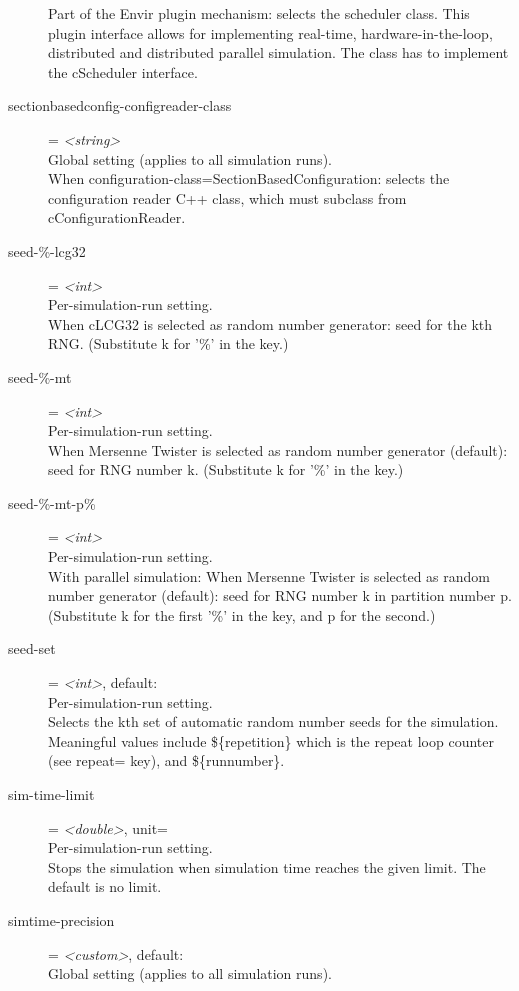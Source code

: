 \begin{description}
    Part of the Envir plugin mechanism: selects the scheduler class. This
    plugin interface allows for implementing real-time, hardware-in-the-loop,
    distributed and distributed parallel simulation. The class has to implement
    the cScheduler interface.
\item[sectionbasedconfig-configreader-class] = \textit{<string>}\\
    Global setting (applies to all simulation runs).\\
    When configuration-class=SectionBasedConfiguration: selects the
    configuration reader C++ class, which must subclass from
    cConfigurationReader.
\item[seed-\%-lcg32] = \textit{<int>}\\
    Per-simulation-run setting.\\
    When cLCG32 is selected as random number generator: seed for the kth RNG.
    (Substitute k for '\%' in the key.)
\item[seed-\%-mt] = \textit{<int>}\\
    Per-simulation-run setting.\\
    When Mersenne Twister is selected as random number generator (default):
    seed for RNG number k. (Substitute k for '\%' in the key.)
\item[seed-\%-mt-p\%] = \textit{<int>}\\
    Per-simulation-run setting.\\
    With parallel simulation: When Mersenne Twister is selected as random
    number generator (default): seed for RNG number k in partition number p.
    (Substitute k for the first '\%' in the key, and p for the second.)
\item[seed-set] = \textit{<int>}, default: \\
    Per-simulation-run setting.\\
    Selects the kth set of automatic random number seeds for the simulation.
    Meaningful values include \$\{repetition\} which is the repeat loop counter
    (see repeat= key), and \$\{runnumber\}.
\item[sim-time-limit] = \textit{<double>}, unit=\\
    Per-simulation-run setting.\\
    Stops the simulation when simulation time reaches the given limit. The
    default is no limit.
\item[simtime-precision] = \textit{<custom>}, default: \\
    Global setting (applies to all simulation runs).\\

\end{description}
